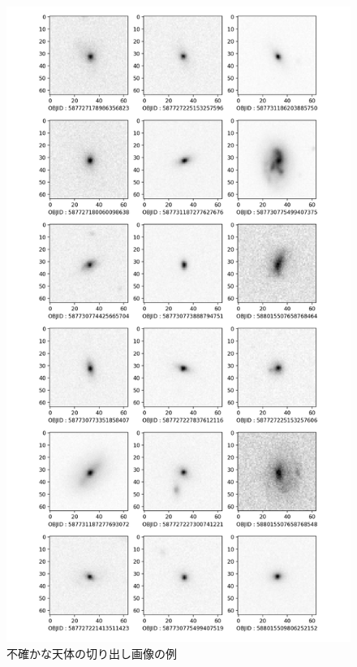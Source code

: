 \documentclass[a4j, 11pt]{jreport}
\begin{document}
\newpage
\begin{figure}[H]
  \centering
  \includegraphics[width=0.5\vsize, keepaspectratio]{images/syuron_4syou_sdss_imgs/uncertain_mini.png}
  \caption{不確かな天体の切り出し画像の例}
  \label{fig:sdss_images_uncertain}
\end{figure}
\end{document}
